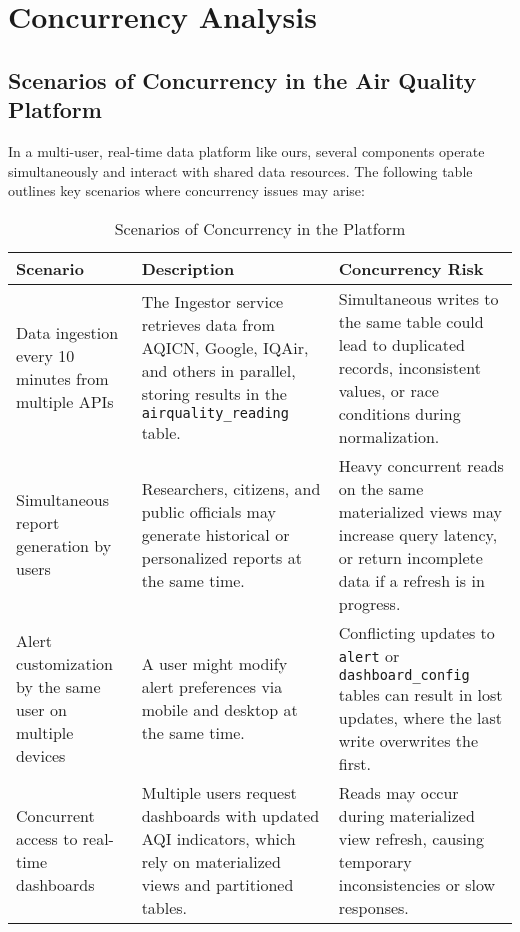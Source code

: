 \section{Concurrency Analysis}

\subsection{Scenarios of Concurrency in the Air Quality Platform}

In a multi-user, real-time data platform like ours, several components operate simultaneously and interact with shared data resources. The following table outlines key scenarios where concurrency issues may arise:

\begin{table}[H]
\centering
\begin{tabularx}{\textwidth}{|X|X|X|}
\hline
\textbf{Scenario} & \textbf{Description} & \textbf{Concurrency Risk} \\
\hline
Data ingestion every 10 minutes from multiple APIs & The Ingestor service retrieves data from AQICN, Google, IQAir, and others in parallel, storing results in the \texttt{airquality\_reading} table. & Simultaneous writes to the same table could lead to duplicated records, inconsistent values, or race conditions during normalization. \\
\hline
Simultaneous report generation by users & Researchers, citizens, and public officials may generate historical or personalized reports at the same time. & Heavy concurrent reads on the same materialized views may increase query latency, or return incomplete data if a refresh is in progress. \\
\hline
Alert customization by the same user on multiple devices & A user might modify alert preferences via mobile and desktop at the same time. & Conflicting updates to \texttt{alert} or \texttt{dashboard\_config} tables can result in lost updates, where the last write overwrites the first. \\
\hline
Concurrent access to real-time dashboards & Multiple users request dashboards with updated AQI indicators, which rely on materialized views and partitioned tables. & Reads may occur during materialized view refresh, causing temporary inconsistencies or slow responses. \\
\hline
\end{tabularx}
\caption{Scenarios of Concurrency in the Platform}
\end{table}

